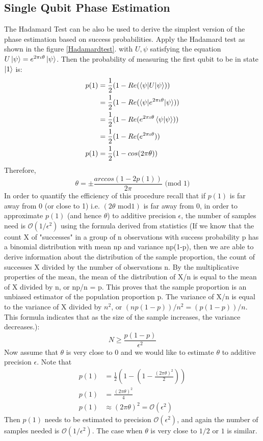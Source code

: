 \subsection{Single Qubit Phase Estimation}
The Hadamard Test can be also be used to derive the simplest version of the phase estimation based on success probabilities. Apply the Hadamard test as shown in the figure \ref{Hadamardtest}. with $U,\psi$ satisfying the equation $U\ket{\psi}=e^{2\pi\iota \theta}\ket{\psi}$.
Then the probability of measuring the first qubit to be in state $\ket{1}$ is:
\begin{align*}
p(1)&=\frac{1}{2}(1-Re(\braket{\psi|U|\psi}))\\
&=\frac{1}{2}(1-Re(\braket{\psi|e^{2\pi\iota\theta}|\psi}))\\
&=\frac{1}{2}(1-Re(e^{2\pi\iota\theta}\braket{\psi|\psi}))\\
&=\frac{1}{2}(1-Re(e^{2\pi\iota \theta}))\\
p(1)&=\frac{1}{2}(1-cos(2\pi \theta))
\end{align*}
Therefore,
\[
\theta=\pm\frac{arccos(1-2p(1))}{2\pi} \text{ (mod 1)}
\]
In order to quantify the efficiency of this procedure recall that if $p(1)$ is far away from 0 (or close to 1) i.e. 
$(2\theta \text{ mod} 1)$ is far away from 0, in order to approximate $p(1)$ (and hence $\theta$) to additive precision $\epsilon$, the
number of samples need is $\mathcal{O}(1/\epsilon^2)$ using the formula 
derived from statistics (If we know that the count X of "successes" in a group of n 
observations with success probability p has a binomial distribution with mean np and 
variance np(1-p), then we are able to derive information about the distribution of 
the sample proportion, the count of successes X divided by the number of 
observations n. By the multiplicative properties of the mean, the mean of the 
distribution of X/n is equal to the mean of X divided by n, or np/n = p. This proves 
that the sample proportion  is an unbiased estimator of the population proportion p. 
The variance of X/n is equal to the variance of X 
divided by $n^2$, or $(np(1-p))/n^2 = (p(1-p))/n $. 
This formula indicates that as the size of the sample increases, the variance decreases.):
\[
    N\geq \frac{p(1-p)}{\epsilon^2}
\] 
Now assume that $\theta$ is very close to 0 and we would like to estimate $\theta$ 
to additive precision $\epsilon$. Note that 
\begin{align*}
p(1)&=\frac{1}{2}\left(1-\left(1-\frac{(2\pi\theta)^2}{2}\right)\right)\\
p(1)&=\frac{(2\pi\theta)^2}{4}\\
p(1)&\approx (2\pi\theta)^2=\mathcal{O}(\epsilon^2)
\end{align*}
Then $p(1)$ needs to be estimated to precision $\mathcal{O}(\epsilon^2)$, and again the number of samples needed is $\mathcal{O}(1/\epsilon^2)$.
The case when $\theta$ is very close to $1/2$ or $1$ is similar.

